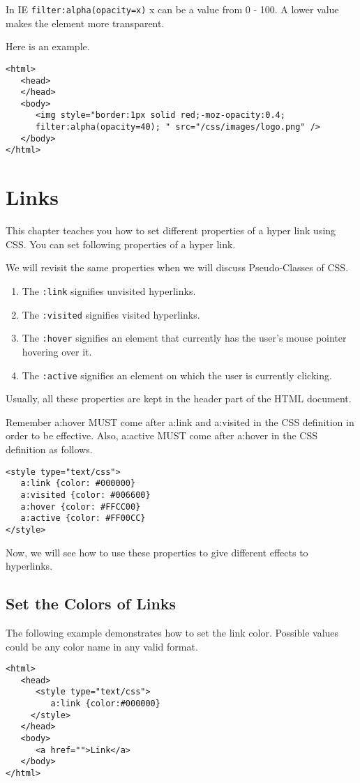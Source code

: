 \documentclass[a4paper,oneside]{book}
\numberwithin{equation}{chapter}
\begin{document}
In IE \verb|filter:alpha(opacity=x)| x can be a value from 0 - 100. A lower value makes the element more transparent.

Here is an example.
\begin{verbatim}
<html>
   <head>
   </head>
   <body>
      <img style="border:1px solid red;-moz-opacity:0.4;
      filter:alpha(opacity=40); " src="/css/images/logo.png" />
   </body>
</html> 
\end{verbatim}
\section{Links}
This chapter teaches you how to set different properties of a hyper link using CSS. You can set following properties of a hyper link. 

We will revisit the same properties when we will discuss Pseudo-Classes of CSS.
\begin{enumerate}
\item The \verb|:link| signifies unvisited hyperlinks.
\item The \verb|:visited| signifies visited hyperlinks.
\item The \verb|:hover| signifies an element that currently has the user's mouse pointer hovering over it.
\item The \verb|:active| signifies an element on which the user is currently clicking.
\end{enumerate}
Usually, all these properties are kept in the header part of the HTML document.

Remember a:hover MUST come after a:link and a:visited in the CSS definition in order to be effective. Also, a:active MUST come after a:hover in the CSS definition as follows.
\begin{verbatim}
<style type="text/css">
   a:link {color: #000000}
   a:visited {color: #006600}
   a:hover {color: #FFCC00}
   a:active {color: #FF00CC}
</style>
\end{verbatim}
Now, we will see how to use these properties to give different effects to hyperlinks.
\subsection{Set the Colors of Links}
The following example demonstrates how to set the link color. Possible values could be any color name in any valid format.
\begin{verbatim}
<html>
   <head>
      <style type="text/css">
         a:link {color:#000000}
     </style>
   </head>
   <body>
      <a href="">Link</a>
   </body>
</html> 
\end{verbatim}
\end{document}
